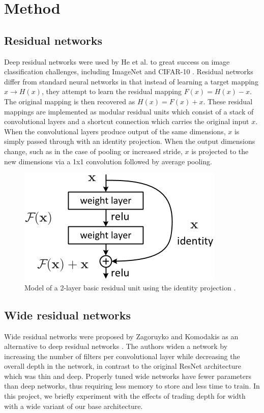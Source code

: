 \documentclass[10pt,twocolumn,letterpaper]{article}
\begin{document}

\section{Method}
\subsection{Residual networks}
Deep residual networks were used by He et al. to great success on image classification challenges, including ImageNet and CIFAR-10 \cite{hekaming2016}. Residual networks differ from standard neural networks in that instead of learning a target mapping $x \rightarrow H(x)$, they attempt to learn the residual mapping $F(x) = H(x) - x$. The original mapping is then recovered as $H(x) = F(x) + x$. These residual mappings are implemented as modular residual units which consist of a stack of convolutional layers and a shortcut connection which carries the original input $x$. When the convolutional layers produce output of the same dimensions, $x$ is simply passed through with an identity projection. When the output dimensions change, such as in the case of pooling or increased stride, $x$ is projected to the new dimensions via a 1x1 convolution followed by average pooling.

 \begin{figure}[h]
	\begin{center}
	\includegraphics[width=.5\linewidth]{resnet}
	\caption{Model of a 2-layer basic residual unit using the identity projection \cite{hekaming2016}. }
	\end{center}
\end{figure}

\subsection{Wide residual networks}
Wide residual networks were proposed by Zagoruyko and Komodakis as an alternative to deep residual networks \cite{zagoruyko2016wide}. The authors widen a network by increasing the number of filters per convolutional layer while decreasing the overall depth in the network, in contrast to the original ResNet architecture which was thin and deep. Properly tuned wide networks have fewer parameters than deep networks, thus requiring less memory to store and less time to train. In this project, we briefly experiment with the effects of trading depth for width with a wide variant of our base architecture.
\end{document}
